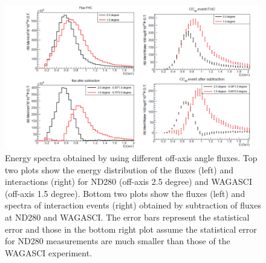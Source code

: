 \begin{figure}[tbhp]
\begin{center}
\includegraphics[width=\textwidth]{fig/fluxsubtractFHC.pdf}
\end{center}
\caption{Energy spectra obtained by using different off-axis angle fluxes.
Top two plots show the energy distribution of the fluxes (left) and interactions (right) for ND280
(off-axis 2.5 degree) and WAGASCI (off-axis 1.5 degree). 
Bottom two plots show the fluxes (left) and spectra of interaction events (right) obtained by
  subtraction of fluxes at ND280 and WAGASCI.
   The error bars represent the statistical error and those in the bottom
right plot assume the statistical error for ND280 measurements are much smaller
than those of the WAGASCI experiment.
}
\label{fig:fluxsubtfhc}
\end{figure}


